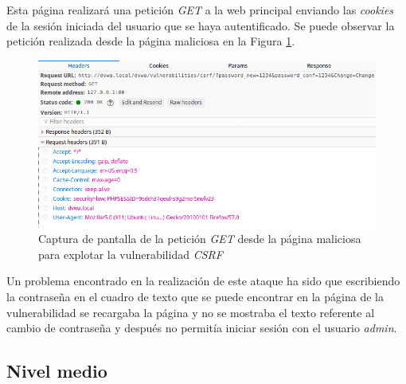 \documentclass{article}
\begin{document}


Esta página realizará una petición \textit{GET} a la web principal enviando las \textit{cookies} de la sesión iniciada del usuario que se haya autentificado. Se puede observar la petición realizada desde la página maliciosa en la Figura \ref{fig:csrf_low}.\\

\begin{figure}[h!]
    \centering
    \includegraphics[scale=0.8]{images/csrf_low.png}
    \caption{Captura de pantalla de la petición \textit{GET} desde la página maliciosa para explotar la vulnerabilidad \textit{CSRF}}
    \label{fig:csrf_low}
\end{figure}

Un problema encontrado en la realización de este ataque ha sido que escribiendo la contraseña en el cuadro de texto que se puede encontrar en la página de la vulnerabilidad se recargaba la página y no se mostraba el texto referente al cambio de contraseña y después no permitía iniciar sesión con el usuario \textit{admin}.\\


\subsection{Nivel medio}
\end{document}
